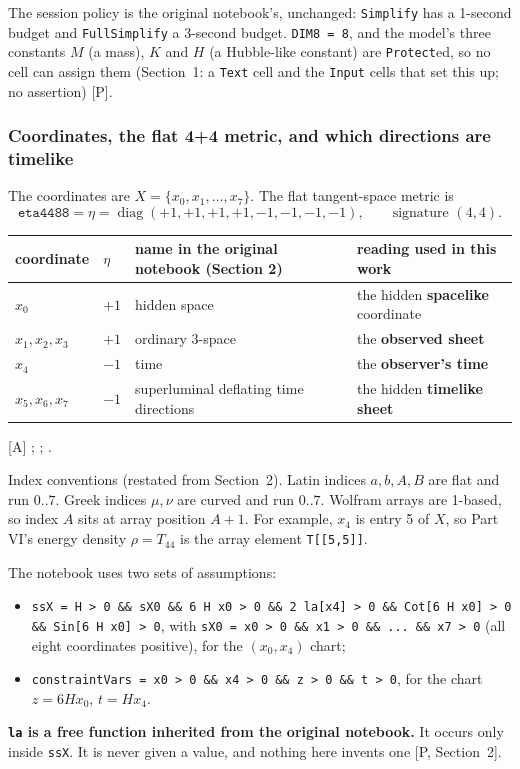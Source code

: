 The session policy is the original notebook's, unchanged: \texttt{Simplify} has a 1-second budget
and \texttt{FullSimplify} a 3-second budget. \texttt{DIM8 = 8}, and the model's three constants
$M$ (a mass), $K$ and $H$ (a Hubble-like constant) are \texttt{Protect}ed, so no cell can assign
them (Section~1: a \texttt{Text} cell and the \texttt{Input} cells that set this up; no
assertion) [P].

\subsubsection{Coordinates, the flat 4+4 metric, and which directions are timelike}
\label{fnd:coords}\label{sec:3.1.2}

The coordinates are $X=\{x_0,x_1,\dots,x_7\}$. The flat tangent-space metric is
\begin{equation}
  \texttt{eta4488} = \eta = \operatorname{diag}(+1,+1,+1,+1,-1,-1,-1,-1),\qquad
  \text{signature }(4,4).
\end{equation}

\begin{center}
\small
\begin{tabular}{@{}llp{}p{}@{}}
\toprule
coordinate & $\eta$ & name in the original notebook (Section 2) & reading used in this work\\
\midrule
$x_0$ & $+1$ & hidden space & the hidden \textbf{spacelike} coordinate\\
$x_1,x_2,x_3$ & $+1$ & ordinary 3-space & the \textbf{observed sheet}\\
$x_4$ & $-1$ & time & the \textbf{observer's time}\\
$x_5,x_6,x_7$ & $-1$ & superluminal deflating time directions & the hidden \textbf{timelike sheet}\\
\bottomrule
\end{tabular}
\end{center}

[A] ; ;
.

Index conventions (restated from Section~2). Latin indices $a,b,A,B$ are flat and run $0..7$.
Greek indices $\mu,\nu$ are curved and run $0..7$. Wolfram arrays are 1-based, so index $A$ sits
at array position $A+1$. For example, $x_4$ is entry 5 of $X$, so Part VI's energy density
$\rho=T_{44}$ is the array element \texttt{T[[5,5]]}.

The notebook uses two sets of assumptions:
\begin{itemize}
  \item \texttt{ssX = H > 0 \&\& sX0 \&\& 6 H x0 > 0 \&\& 2 la[x4] > 0 \&\& Cot[6 H x0] > 0
        \&\& Sin[6 H x0] > 0}, with \texttt{sX0 = x0 > 0 \&\& x1 > 0 \&\& ... \&\& x7 > 0} (all
        eight coordinates positive), for the $(x_0,x_4)$ chart;
  \item \texttt{constraintVars = x0 > 0 \&\& x4 > 0 \&\& z > 0 \&\& t > 0}, for the chart
        $z = 6Hx_0$, $t = Hx_4$.
\end{itemize}
\textbf{\texttt{la} is a free function inherited from the original notebook.} It occurs only
inside \texttt{ssX}. It is never given a value, and nothing here invents one [P, Section~2].

